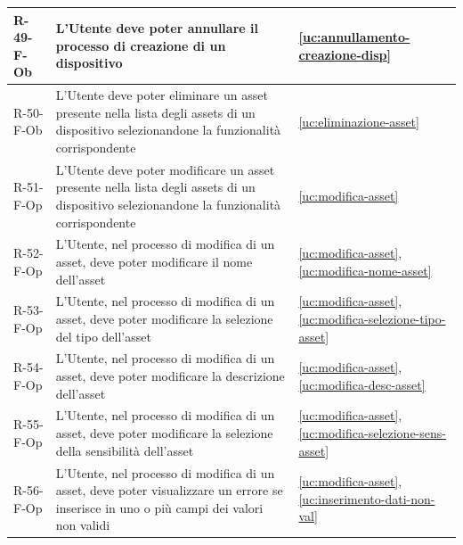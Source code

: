 ﻿\documentclass[a4paper,12pt]{article}
\begin{document}
{{\begin{longtable}{|l|p{}|p{}|}
            R-49-F-Ob       & L'Utente deve poter annullare il processo di creazione di un dispositivo                                                                                                                    & \ref{uc:annullamento-creazione-disp}                                               \\ \hline
            R-50-F-Ob       & L'Utente deve poter eliminare un asset presente nella lista degli assets di un dispositivo selezionandone la funzionalità corrispondente                                                    & \ref{uc:eliminazione-asset}                                               \\ \hline
            R-51-F-Op       & L'Utente deve poter modificare un asset presente nella lista degli assets di un dispositivo selezionandone la funzionalità corrispondente                                                   & \ref{uc:modifica-asset}                                               \\ \hline
            R-52-F-Op       & L'Utente, nel processo di modifica di un asset, deve poter modificare il nome dell'asset                                                                                               & \ref{uc:modifica-asset}, \ref{uc:modifica-nome-asset}                 \\ \hline
            R-53-F-Op       & L'Utente, nel processo di modifica di un asset, deve poter modificare la selezione del tipo dell'asset                                                                                 & \ref{uc:modifica-asset}, \ref{uc:modifica-selezione-tipo-asset}                 \\ \hline
            R-54-F-Op       & L'Utente, nel processo di modifica di un asset, deve poter modificare la descrizione dell'asset                                                                                        & \ref{uc:modifica-asset}, \ref{uc:modifica-desc-asset}                 \\ \hline
            R-55-F-Op       & L'Utente, nel processo di modifica di un asset, deve poter modificare la selezione della sensibilità dell'asset                                                                        & \ref{uc:modifica-asset}, \ref{uc:modifica-selezione-sens-asset}                 \\ \hline
            R-56-F-Op       & L'Utente, nel processo di modifica di un asset, deve poter visualizzare un errore se inserisce in uno o più campi dei valori non validi                                                     & \ref{uc:modifica-asset}, \ref{uc:inserimento-dati-non-val}                     \\ \hline

\end{longtable}}}
\end{document}
